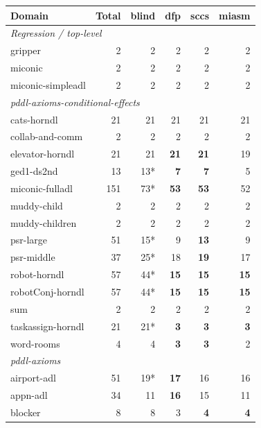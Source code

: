 \documentclass[11pt,a4paper]{article}
\begin{document}
\begin{center}
\small
\setlength{\tabcolsep}{5pt}
\begin{longtable}{lrrrrr}
\toprule
\textbf{Domain} & \textbf{Total} & \textbf{blind} & \textbf{dfp} & \textbf{sccs} & \textbf{miasm} \\
\midrule
\endhead
\multicolumn{6}{l}{\textit{Regression / top-level}} \\
gripper             &   2 &  2 &  2 &  2 &  2 \\
miconic             &   2 &  2 &  2 &  2 &  2 \\
miconic-simpleadl   &   2 &  2 &  2 &  2 &  2 \\
\midrule
\multicolumn{6}{l}{\textit{pddl-axioms-conditional-effects}} \\
cats-horndl         &  21 & 21 & 21 & 21 & 21 \\
collab-and-comm     &   2 &  2 &  2 &  2 &  2 \\
elevator-horndl     &  21 & 21 & \textbf{21} & \textbf{21} & 19 \\
ged1-ds2nd          &  13 & 13* & \textbf{7} & \textbf{7} &  5 \\
miconic-fulladl     & 151 & 73* & \textbf{53} & \textbf{53} & 52 \\
muddy-child         &   2 &  2 &  2 &  2 &  2 \\
muddy-children      &   2 &  2 &  2 &  2 &  2 \\
psr-large           &  51 & 15* &  9 & \textbf{13} &  9 \\
psr-middle          &  37 & 25* & 18 & \textbf{19} & 17 \\
robot-horndl        &  57 & 44* & \textbf{15} & \textbf{15} & \textbf{15} \\
robotConj-horndl    &  57 & 44* & \textbf{15} & \textbf{15} & \textbf{15} \\
sum                 &   2 &  2 &  2 &  2 &  2 \\
taskassign-horndl   &  21 & 21* & \textbf{3} & \textbf{3} & \textbf{3} \\
word-rooms          &   4 &  4 & \textbf{3} & \textbf{3} &  2 \\
\midrule
\multicolumn{6}{l}{\textit{pddl-axioms}} \\
airport-adl         &  51 & 19* & \textbf{17} & 16 & 16 \\
appn-adl            &  34 & 11 & \textbf{16} & 15 & 11 \\
blocker             &   8 &  8 &  3 &  \textbf{4} &  \textbf{4} \\

\end{longtable}
\end{center}
\end{document}
